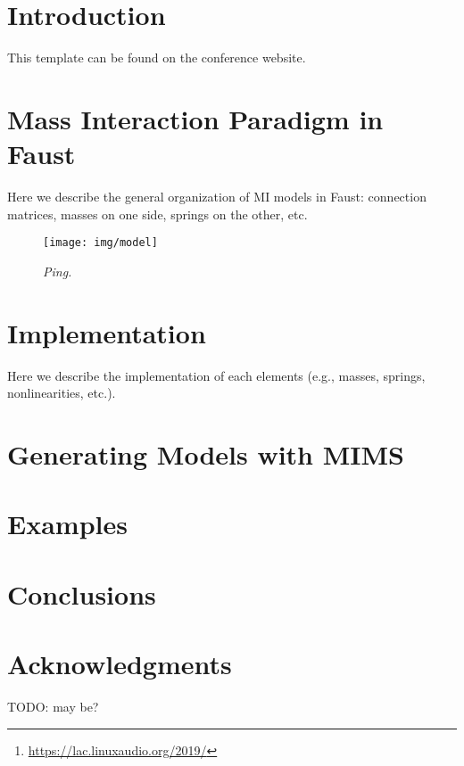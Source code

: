 \documentclass[twoside,letterpaper]{article}
\title{\papertitle}
\newif\ifpdf
\begin{document}
\ifpdf %
  \DeclareGraphicsExtensions{.png,.jpg,.pdf}
\else  %
\fi

\maketitle

\begin{abstract}
This is the template file for the proceedings of the 17$^{\text{th}}$ 
Linux Audio Conference (LAC-19).
This template has been derived from DAFx-16 and IFC-18 templates and aims at 
producing conference proceedings in electronic form.
The format is essentially the one used for ICASSP conferences. Please use
either this \LaTeX{} or the accompanying LibreOffice formats when preparing your
submission. The templates are available in electronic form.\footnote{
\href{https://lac.linuxaudio.org/2019/}{https://lac.linuxaudio.org/2019/}}
\end{abstract}

\section{Introduction}
\label{sec:intro}

This template can be found on the conference website.

\section{Mass Interaction Paradigm in Faust}

Here we describe the general organization of MI models in Faust: connection matrices, masses on one side, springs on the other, etc.

\begin{figure}[ht]
\centerline{\texttt{[image: img/model]}}
\caption{\label{fft_plot}{\it Ping.}}
\end{figure}

\section{Implementation}

Here we describe the implementation of each elements (e.g., masses, springs, nonlinearities, etc.).

\section{Generating Models with MIMS}

\section{Examples}

\section{Conclusions}

\section{Acknowledgments}

TODO: may be?

\nocite{*}

\end{document}
